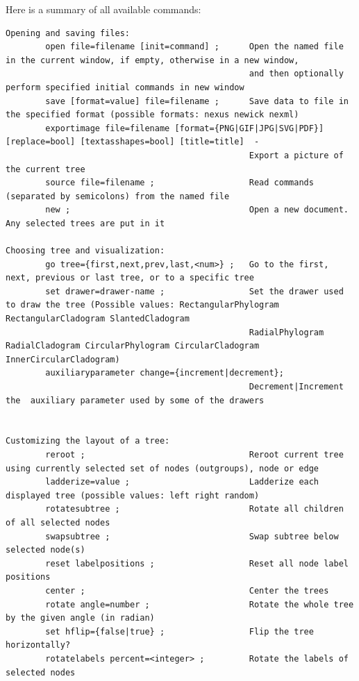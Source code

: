 \documentclass[11pt]{article}
\begin{document}
Here is a summary of all available commands:

\tiny
\begin{verbatim}
Opening and saving files:
        open file=filename [init=command] ;      Open the named file in the current window, if empty, otherwise in a new window,
                                                 and then optionally perform specified initial commands in new window
        save [format=value] file=filename ;      Save data to file in the specified format (possible formats: nexus newick nexml)
        exportimage file=filename [format={PNG|GIF|JPG|SVG|PDF}] [replace=bool] [textasshapes=bool] [title=title]  -
                                                 Export a picture of the current tree
        source file=filename ;                   Read commands (separated by semicolons) from the named file 
        new ;                                    Open a new document. Any selected trees are put in it

Choosing tree and visualization:
        go tree={first,next,prev,last,<num>} ;   Go to the first, next, previous or last tree, or to a specific tree
        set drawer=drawer-name ;                 Set the drawer used to draw the tree (Possible values: RectangularPhylogram RectangularCladogram SlantedCladogram
                                                 RadialPhylogram RadialCladogram CircularPhylogram CircularCladogram InnerCircularCladogram)
        auxiliaryparameter change={increment|decrement}; 
                                                 Decrement|Increment the  auxiliary parameter used by some of the drawers


Customizing the layout of a tree:
        reroot ;                                 Reroot current tree using currently selected set of nodes (outgroups), node or edge
        ladderize=value ;                        Ladderize each displayed tree (possible values: left right random)
        rotatesubtree ;                          Rotate all children of all selected nodes
        swapsubtree ;                            Swap subtree below selected node(s)
        reset labelpositions ;                   Reset all node label positions
        center ;                                 Center the trees
        rotate angle=number ;                    Rotate the whole tree by the given angle (in radian)
        set hflip={false|true} ;                 Flip the tree horizontally?
        rotatelabels percent=<integer> ;         Rotate the labels of selected nodes


\end{verbatim}
\end{document}
